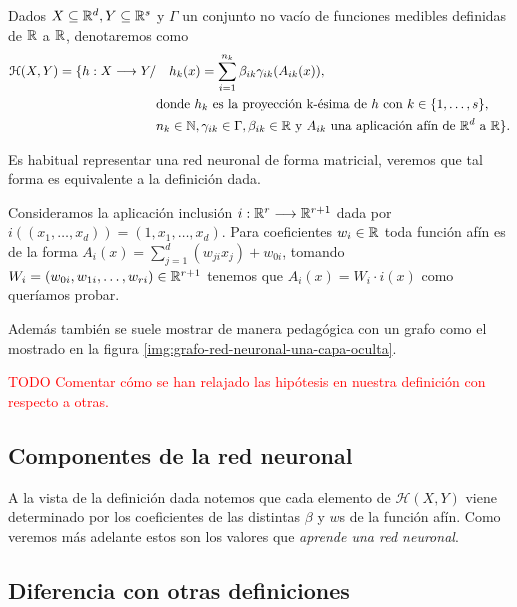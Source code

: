 \begin{definicion}
    Dados $X \subseteq \mathbb{R}^d, Y \subseteq \mathbb{R}^s$ y  $\Gamma$ un conjunto no vacío de funciones medibles definidas de $\mathbb{R}$ a $\mathbb{R}$, denotaremos como 
    \begin{align}
        \mathcal{H}(X,Y) 
        =
        \{
            h : X \longrightarrow Y 
            /& \quad 
            h_k(x) = 
            \sum_{i=1}^{n_k} \beta_{i k} \gamma_{i k}( A_{i k}(x)), \\
            & \text{donde  $h_k$  es la proyección k-ésima de $h$ con 
            $k \in \{1, \ldots, s\}$}, \\
            & n_k \in \mathbb{N},\gamma_{i k} \in \Gamma , \beta_{i k} \in \mathbb{R}
             \text{ y }A_{i k} \text{ una aplicación afín de $\mathbb{R}^d$ a $\mathbb{R}$}           
        \}.
    \end{align}
\end{definicion}

Es habitual representar una red neuronal de forma matricial, veremos que tal forma es equivalente a la definición dada. 

Consideramos la aplicación inclusión 
$i: \mathbb{R}^r \longrightarrow \mathbb{R}^{r+1}$ dada por 
 $i((x_1, \ldots, x_d)) = (1,x_1, \ldots, x_d).$
Para coeficientes $w_i \in \mathbb{R}$ toda función afín es de la forma 
$A_{i}(x)= \sum_{j=1}^d( w_{j i} x_j) + w_{0i}$, 
tomando $W_i = (w_{0 i}, w_{1 i}, \ldots, w_{r i}) \in \mathbb{R}^{r+1}$ tenemos que 
$A_i(x) = W_i \cdot i(x)$ como queríamos probar. 

Además también se suele mostrar de manera pedagógica con un grafo como el mostrado en la 
figura \ref{img:grafo-red-neuronal-una-capa-oculta}.

\textcolor{red}{TODO Comentar cómo se han relajado las hipótesis en nuestra definición con respecto a otras.}

\subsection*{Componentes de la red neuronal}  

A la vista de la definición dada notemos que cada elemento de 
$\mathcal{H}(X,Y)$ viene determinado por los coeficientes 
de las distintas $\beta$ y  $w$s de la función afín. Como veremos más adelante estos son los valores que \textit{aprende una red neuronal}.

\subsection*{Diferencia con otras definiciones}  

